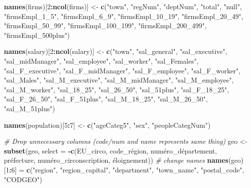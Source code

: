 \documentclass[]{article}
\newenvironment{Shaded}{\begin{snugshade}}{\end{snugshade}}
\newcommand{\KeywordTok}[1]{\textcolor[rgb]{0.13,0.29,0.53}{\textbf{#1}}}
\newcommand{\DataTypeTok}[1]{\textcolor[rgb]{0.13,0.29,0.53}{#1}}
\newcommand{\DecValTok}[1]{\textcolor[rgb]{0.00,0.00,0.81}{#1}}
\newcommand{\StringTok}[1]{\textcolor[rgb]{0.31,0.60,0.02}{#1}}
\newcommand{\CommentTok}[1]{\textcolor[rgb]{0.56,0.35,0.01}{\textit{#1}}}
\newcommand{\OperatorTok}[1]{\textcolor[rgb]{0.81,0.36,0.00}{\textbf{#1}}}
\newcommand{\NormalTok}[1]{#1}
\begin{document}
\begin{Shaded}
\begin{Highlighting}[]
\KeywordTok{names}\NormalTok{(firms)[}\DecValTok{2}\OperatorTok{:}\KeywordTok{ncol}\NormalTok{(firms)] <-}
\StringTok{  }\KeywordTok{c}\NormalTok{(}\StringTok{"town"}\NormalTok{, }
    \StringTok{"regNum"}\NormalTok{,}
    \StringTok{"deptNum"}\NormalTok{,}
    \StringTok{"total"}\NormalTok{,}
    \StringTok{"null"}\NormalTok{,}
    \StringTok{"firmsEmpl_1_5"}\NormalTok{,}
    \StringTok{"firmsEmpl_6_9"}\NormalTok{,}
    \StringTok{"firmsEmpl_10_19"}\NormalTok{,}
    \StringTok{"firmsEmpl_20_49"}\NormalTok{,}
    \StringTok{"firmsEmpl_50_99"}\NormalTok{,}
    \StringTok{"firmsEmpl_100_199"}\NormalTok{,}
    \StringTok{"firmsEmpl_200_499"}\NormalTok{,}
    \StringTok{"firmsEmpl_500plus"}\NormalTok{)}

\KeywordTok{names}\NormalTok{(salary)[}\DecValTok{2}\OperatorTok{:}\KeywordTok{ncol}\NormalTok{(salary)] <-}
\StringTok{  }\KeywordTok{c}\NormalTok{(}\StringTok{"town"}\NormalTok{,}
    \StringTok{"sal_general"}\NormalTok{,    }
    \StringTok{"sal_executive"}\NormalTok{,}
    \StringTok{"sal_midManager"}\NormalTok{,}
    \StringTok{"sal_employee"}\NormalTok{,}
    \StringTok{"sal_worker"}\NormalTok{,}
    \StringTok{"sal_Females"}\NormalTok{,}
    \StringTok{"sal_F_executive"}\NormalTok{,}
    \StringTok{"sal_F_midManager"}\NormalTok{,}
    \StringTok{"sal_F_employee"}\NormalTok{,}
    \StringTok{"sal_F_worker"}\NormalTok{,}
    \StringTok{"sal_Males"}\NormalTok{,}
    \StringTok{"sal_M_executive"}\NormalTok{,}
    \StringTok{"sal_M_midManager"}\NormalTok{,}
    \StringTok{"sal_M_employee"}\NormalTok{,}
    \StringTok{"sal_M_worker"}\NormalTok{,}
    \StringTok{"sal_18_25"}\NormalTok{,}
    \StringTok{"sal_26_50"}\NormalTok{,}
    \StringTok{"sal_51plus"}\NormalTok{,}
    \StringTok{"sal_F_18_25"}\NormalTok{,}
    \StringTok{"sal_F_26_50"}\NormalTok{,}
    \StringTok{"sal_F_51plus"}\NormalTok{,}
    \StringTok{"sal_M_18_25"}\NormalTok{,}
    \StringTok{"sal_M_26_50"}\NormalTok{,}
    \StringTok{"sal_M_51plus"}\NormalTok{)}

\KeywordTok{names}\NormalTok{(population)[}\DecValTok{5}\OperatorTok{:}\DecValTok{7}\NormalTok{] <-}
\StringTok{  }\KeywordTok{c}\NormalTok{(}\StringTok{"ageCateg5"}\NormalTok{,}
    \StringTok{"sex"}\NormalTok{,}
    \StringTok{"peopleCategNum"}\NormalTok{)}

\CommentTok{# Drop unnecessary columns (code/num and name represents same thing)}
\NormalTok{geo <-}\StringTok{ }\KeywordTok{subset}\NormalTok{(geo, }\DataTypeTok{select =} \OperatorTok{-}\KeywordTok{c}\NormalTok{(EU_circo, code_région, numéro_département, préfecture, numéro_circonscription, éloignement))}
\CommentTok{# change names }
\KeywordTok{names}\NormalTok{(geo)[}\DecValTok{1}\OperatorTok{:}\DecValTok{6}\NormalTok{] =}\StringTok{ }
\StringTok{  }\KeywordTok{c}\NormalTok{(}\StringTok{"region"}\NormalTok{, }
    \StringTok{"region_capital"}\NormalTok{, }
    \StringTok{"department"}\NormalTok{, }
    \StringTok{"town_name"}\NormalTok{, }
    \StringTok{"postal_code"}\NormalTok{, }
    \StringTok{"CODGEO"}\NormalTok{)}
\end{Highlighting}
\end{Shaded}
\end{document}
